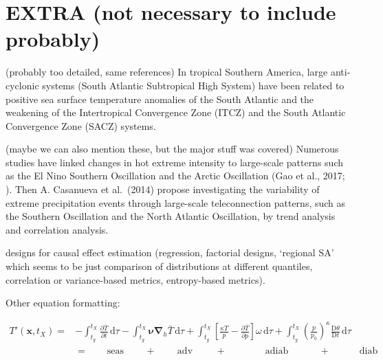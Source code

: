 \documentclass[11pt,a4paper,twoside,openright]{report}
\theoremstyle{definition}
\begin{document}
\section{EXTRA (not necessary to include probably)}\label{extra-not-necessary-to-include-probably}

(probably too detailed, same references)
In tropical Southern America, large anti-cyclonic systems (South Atlantic Subtropical High System) have been related to positive sea surface temperature anomalies of the South Atlantic and the weakening of the Intertropical Convergence Zone (ITCZ) and the South Atlantic Convergence Zone (SACZ) systems.

(maybe we can also mention these, but the major stuff was covered)
Numerous studies have linked changes in hot extreme intensity to large-scale patterns such as the El Nino Southern Oscillation and the Arctic Oscillation (Gao et al., 2017; ). Then A. Casanueva et al.~(2014) propose investigating the variability of extreme precipitation events through large-scale teleconnection patterns, such as the Southern Oscillation and the North Atlantic Oscillation, by trend analysis and correlation analysis.

designs for causal effect estimation (regression, factorial designs, `regional SA' which seems to be just comparison of distributions at different quantiles, correlation or variance-based metrics, entropy-based metrics).

Other equation formatting:

\begin{equation}
 \begin{split}
   T'(\mathbf{x},t_X) = & - \int_{t_g}^{t_X} \frac{\partial \bar{T}}{\partial t} \, \text{d}\tau - \int_{t_g}^{t_X} \mathbf{\nu} \mathbf{\nabla}_h \bar{T} \, \text{d}\tau + \int_{t_g}^{t_X} \left[ \frac{\kappa T}{p} - \frac{\partial \bar{T}}{\partial p}\right] \omega \, \text{d}\tau + \int_{t_g}^{t_X} \left( \frac{p}{p_0} \right)^\kappa \frac{\text{D}\theta}{\text{D}t} \, \text{d}\tau   \\
   & = \qquad \text{seas} \qquad \, + \, \quad \quad \text{adv} \qquad \, \, + \qquad \qquad \text{adiab} \qquad \quad \,  + \qquad \quad \text{diab} 
\end{split}
\end{equation}
\end{document}

